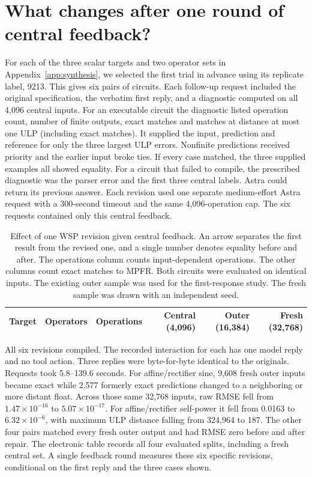 \section{What changes after one round of central feedback?}
\label{app:repair}
For each of the three scalar targets and two operator sets in Appendix~\ref{app:synthesis}, we selected the first trial in advance using its replicate label, 9213. This gives six pairs of circuits. Each follow-up request included the original specification, the verbatim first reply, and a diagnostic computed on all 4,096 central inputs. For an executable circuit the diagnostic listed operation count, number of finite outputs, exact matches and matches at distance at most one ULP (including exact matches). It supplied the input, prediction and reference for only the three largest ULP errors. Nonfinite predictions received priority and the earlier input broke ties. If every case matched, the three supplied examples all showed equality. For a circuit that failed to compile, the prescribed diagnostic was the parser error and the first three central labels. Astra could return its previous answer. Each revision used one separate medium-effort Astra request with a 300-second timeout and the same 4,096-operation cap. The six requests contained only this central feedback.

\begin{table}[htbp]
\centering\small\setlength{\tabcolsep}{3.5pt}
\caption{Effect of one WSP revision given central feedback. An arrow separates the first result from the revised one, and a single number denotes equality before and after. The operations column counts input-dependent operations. The other columns count exact matches to MPFR. Both circuits were evaluated on identical inputs. The existing outer sample was used for the first-response study. The fresh sample was drawn with an independent seed.}
\label{tab:repair}
\begin{tabular}{@{}llrrrr@{}}\toprule
Target & Operators & Operations & Central (4,096) & Outer (16,384) & Fresh (32,768)\\\midrule
\end{tabular}
\end{table}

All six revisions compiled. The recorded interaction for each has one model reply and no tool action. Three replies were byte-for-byte identical to the originals. Requests took 5.8--139.6 seconds. For affine/rectifier sine, 9,608 fresh outer inputs became exact while 2,577 formerly exact predictions changed to a neighboring or more distant float. Across those same 32,768 inputs, raw RMSE fell from $1.47\times10^{-16}$ to $5.07\times10^{-17}$. For affine/rectifier self-power it fell from 0.0163 to $6.32\times10^{-6}$, with maximum ULP distance falling from 324,964 to 187. The other four pairs matched every fresh outer output and had RMSE zero before and after repair. The electronic table records all four evaluated splits, including a fresh central set. A single feedback round measures these six specific revisions, conditional on the first reply and the three cases shown.
